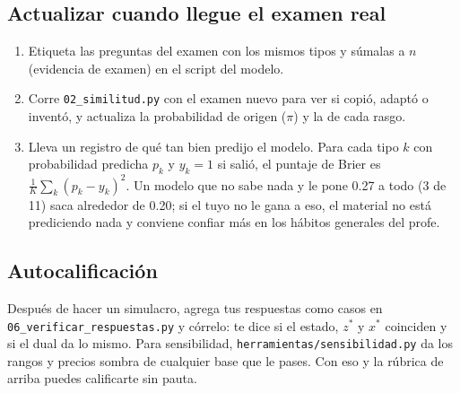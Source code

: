 \documentclass[11pt]{article}
\newcommand{\cod}[1]{\texttt{#1}}
\begin{document}
\subsection{Actualizar cuando llegue el examen real}
\begin{enumerate}
\item Etiqueta las preguntas del examen con los mismos tipos y súmalas a $n$ (evidencia de
examen) en el script del modelo.
\item Corre \cod{02\_similitud.py} con el examen nuevo para ver si copió, adaptó o inventó, y
actualiza la probabilidad de origen ($\pi$) y la de cada rasgo.
\item Lleva un registro de qué tan bien predijo el modelo. Para cada tipo $k$ con probabilidad
predicha $p_k$ y $y_k=1$ si salió, el puntaje de Brier es
$\frac{1}{K}\sum_k (p_k-y_k)^2$. Un modelo que no sabe nada y le pone 0.27 a todo (3 de 11)
saca alrededor de 0.20; si el tuyo no le gana a eso, el material no está prediciendo nada y
conviene confiar más en los hábitos generales del profe.
\end{enumerate}

\subsection{Autocalificación}
Después de hacer un simulacro, agrega tus respuestas como casos en
\cod{06\_verificar\_respuestas.py} y córrelo: te dice si el estado, $z^*$ y $x^*$ coinciden y
si el dual da lo mismo. Para sensibilidad, \cod{herramientas/sensibilidad.py} da los rangos y
precios sombra de cualquier base que le pases. Con eso y la rúbrica de arriba puedes
calificarte sin pauta.
\end{document}
